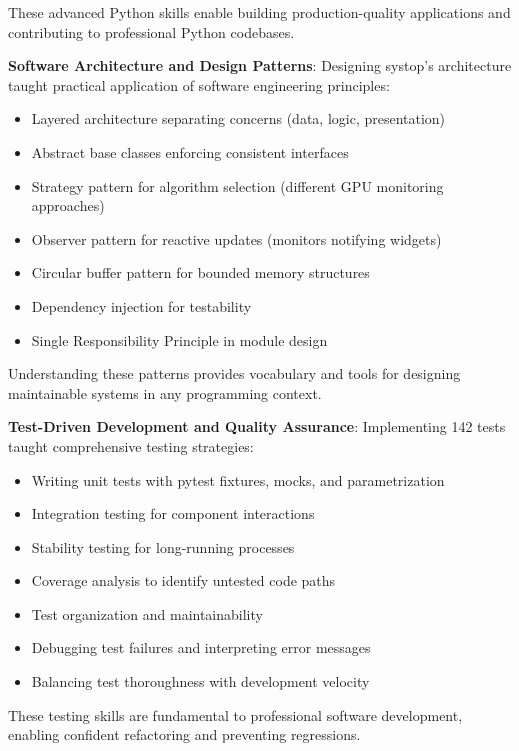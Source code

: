 \documentclass[12pt,a4paper,oneside]{report}
\begin{document}
These advanced Python skills enable building production-quality applications and contributing to professional Python codebases.

\textbf{Software Architecture and Design Patterns}: Designing systop's architecture taught practical application of software engineering principles:

\begin{itemize}
    \item Layered architecture separating concerns (data, logic, presentation)
    \item Abstract base classes enforcing consistent interfaces
    \item Strategy pattern for algorithm selection (different GPU monitoring approaches)
    \item Observer pattern for reactive updates (monitors notifying widgets)
    \item Circular buffer pattern for bounded memory structures
    \item Dependency injection for testability
    \item Single Responsibility Principle in module design
\end{itemize}

Understanding these patterns provides vocabulary and tools for designing maintainable systems in any programming context.

\textbf{Test-Driven Development and Quality Assurance}: Implementing 142 tests taught comprehensive testing strategies:

\begin{itemize}
    \item Writing unit tests with pytest fixtures, mocks, and parametrization
    \item Integration testing for component interactions
    \item Stability testing for long-running processes
    \item Coverage analysis to identify untested code paths
    \item Test organization and maintainability
    \item Debugging test failures and interpreting error messages
    \item Balancing test thoroughness with development velocity
\end{itemize}

These testing skills are fundamental to professional software development, enabling confident refactoring and preventing regressions.
\end{document}
